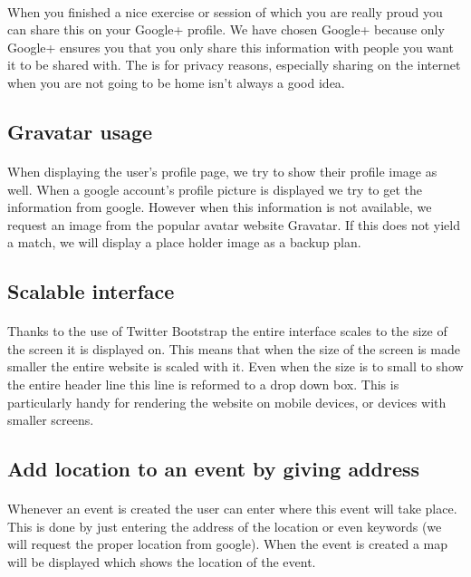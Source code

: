 \documentclass[11pt,a4paper]{scrartcl}
\begin{document}
\paragraph{}When you finished a nice exercise or session of which you are really proud you can share this on your Google+ profile. We have chosen Google+ because only Google+ ensures you that you only share this information with people you want it to be shared with. The is for privacy reasons, especially sharing on the internet when you are not going to be home isn't always a good idea.

\subsection{Gravatar usage}
\paragraph{}When displaying the user's profile page, we try to show their profile image as well. When a google account's profile picture is displayed we try to get the information from google. However when this information is not available, we request an image from the popular avatar website Gravatar. If this does not yield a match, we will display a place holder image as a backup plan.
\subsection{Scalable interface}
\paragraph{}Thanks to the use of Twitter Bootstrap the entire interface scales to the size of the screen it is displayed on. This means that when the size of the screen is made smaller the entire website is scaled with it. Even when the size is to small to show the entire header line this line is reformed to a drop down box. This is particularly handy for rendering the website on mobile devices, or devices with smaller screens.
\subsection{Add location to an event by giving address}
\paragraph{}Whenever an event is created the user can enter where this event will take place. This is done by just entering the address of the location or even keywords (we will request the proper location from google). When the event is created a map will be displayed which shows the location of the event.
\end{document}
